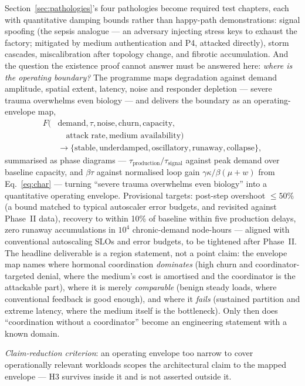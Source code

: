\documentclass[twoside,twocolumn,usenatbib]{mnras}
\begin{document}
Section~\ref{sec:pathologies}'s four pathologies become required test
chapters, each with quantitative damping bounds rather than happy-path
demonstrations: signal spoofing (the sepsis
analogue --- an adversary injecting stress keys to exhaust the
factory; mitigated by medium authentication and P4, attacked
directly), storm cascades, miscalibration after topology change, and
fibrotic accumulation. And the question the existence proof cannot
answer must be answered here: \emph{where is the operating boundary?}
The programme maps degradation against demand amplitude, spatial
extent, latency, noise and responder depletion --- severe trauma
overwhelms even biology --- and delivers the boundary as an
operating-envelope map,
\begin{align}
F(&\text{demand}, \tau, \text{noise}, \text{churn}, \text{capacity},
\nonumber\\
&\quad \text{attack rate}, \text{medium availability}) \nonumber\\
&\to \{\text{stable}, \text{underdamped}, \text{oscillatory},
\text{runaway}, \text{collapse}\},
\label{eq:envelope}
\end{align}
summarised as phase diagrams ---
$\tau_{\mathrm{production}}/\tau_{\mathrm{signal}}$ against
peak demand over baseline capacity, and $\beta\tau$ against
normalised loop gain $\gamma\kappa/\beta(\mu+w)$ from
Eq.~\ref{eq:char} --- turning
``severe trauma overwhelms even biology'' into a quantitative
operating envelope. Provisional targets: post-step
overshoot $\le 50\%$ (a bound matched to typical autoscaler error
budgets, and revisited against Phase~II data), recovery to within
10\% of baseline within five
production delays, zero runaway accumulations in $10^4$
chronic-demand node-hours --- aligned with conventional autoscaling
SLOs and error budgets, to be tightened after Phase~II. The headline
deliverable is a region statement, not a point claim: the envelope map
names where hormonal coordination \emph{dominates} (high churn and
coordinator-targeted denial, where the medium's cost is amortised and
the coordinator is the attackable part), where it is merely
\emph{comparable} (benign steady loads, where conventional feedback is
good enough), and where it \emph{fails} (sustained partition and
extreme latency, where the medium itself is the bottleneck). Only then
does
``coordination without a
coordinator'' become an engineering statement with a known domain.

\emph{Claim-reduction criterion}: an operating envelope too narrow to
cover
operationally relevant workloads scopes the architectural claim to the
mapped envelope --- H3 survives inside it and is not asserted outside
it.
\end{document}
